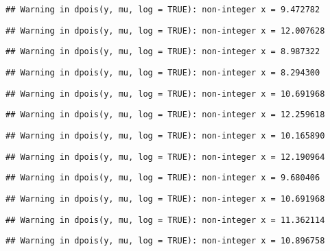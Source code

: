 \documentclass[
]{article}
\begin{document}
\begin{verbatim}
## Warning in dpois(y, mu, log = TRUE): non-integer x = 9.472782
\end{verbatim}

\begin{verbatim}
## Warning in dpois(y, mu, log = TRUE): non-integer x = 12.007628
\end{verbatim}

\begin{verbatim}
## Warning in dpois(y, mu, log = TRUE): non-integer x = 8.987322
\end{verbatim}

\begin{verbatim}
## Warning in dpois(y, mu, log = TRUE): non-integer x = 8.294300
\end{verbatim}

\begin{verbatim}
## Warning in dpois(y, mu, log = TRUE): non-integer x = 10.691968
\end{verbatim}

\begin{verbatim}
## Warning in dpois(y, mu, log = TRUE): non-integer x = 12.259618
\end{verbatim}

\begin{verbatim}
## Warning in dpois(y, mu, log = TRUE): non-integer x = 10.165890
\end{verbatim}

\begin{verbatim}
## Warning in dpois(y, mu, log = TRUE): non-integer x = 12.190964
\end{verbatim}

\begin{verbatim}
## Warning in dpois(y, mu, log = TRUE): non-integer x = 9.680406
\end{verbatim}

\begin{verbatim}
## Warning in dpois(y, mu, log = TRUE): non-integer x = 10.691968
\end{verbatim}

\begin{verbatim}
## Warning in dpois(y, mu, log = TRUE): non-integer x = 11.362114
\end{verbatim}

\begin{verbatim}
## Warning in dpois(y, mu, log = TRUE): non-integer x = 10.896758
\end{verbatim}
\end{document}
